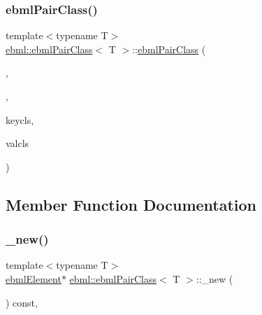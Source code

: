 \mbox{\label{classebml_1_1ebmlPairClass_a399efa1fe09fc7c381081a121cb039f7}} 
\subsubsection{\texorpdfstring{ebml\+Pair\+Class()}{ebmlPairClass()}\hspace{0.1cm}{\footnotesize\ttfamily [4/4]}}
{\footnotesize\ttfamily template$<$typename T$>$ \\
\mbox{\hyperlink{classebml_1_1ebmlPairClass}{ebml\+::ebml\+Pair\+Class}}$<$ T $>$\+::\mbox{\hyperlink{classebml_1_1ebmlPairClass}{ebml\+Pair\+Class}} (\begin{DoxyParamCaption}\item[{\mbox{\hyperlink{namespaceebml_a86c5f604ddf12a74aa9812e997a58691}{ebml\+I\+D\+\_\+t}}}]{,  }\item[{const std\+::wstring \&}]{,  }\item[{const \mbox{\hyperlink{classebml_1_1ebmlDataElementClass}{ebml\+Data\+Element\+Class}}$<$ T $>$ $\ast$}]{keycls,  }\item[{const \mbox{\hyperlink{classebml_1_1ebmlElementClass}{ebml\+Element\+Class}} $\ast$}]{valcls }\end{DoxyParamCaption})}



\subsection{Member Function Documentation}
\mbox{\label{classebml_1_1ebmlPairClass_abb748027028719a4a1682c089ac21226}} 
\subsubsection{\texorpdfstring{\+\_\+new()}{\_new()}}
{\footnotesize\ttfamily template$<$typename T$>$ \\
\mbox{\hyperlink{classebml_1_1ebmlElement}{ebml\+Element}}$\ast$ \mbox{\hyperlink{classebml_1_1ebmlPairClass}{ebml\+::ebml\+Pair\+Class}}$<$ T $>$\+::\+\_\+new (\begin{DoxyParamCaption}{ }\end{DoxyParamCaption}) const\hspace{0.3cm}{\ttfamily [protected]}, {\ttfamily [virtual]}}



